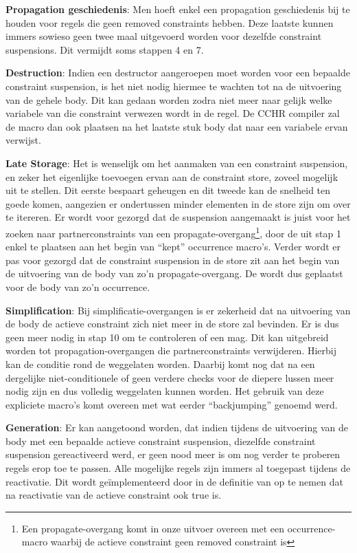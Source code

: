 {{\bf Propagation geschiedenis}: Men hoeft enkel een propagation geschiedenis bij te houden voor regels die geen removed constraints hebben. Deze laatste kunnen immers sowieso geen twee maal uitgevoerd worden voor dezelfde constraint suspensions. Dit vermijdt soms stappen 4 en 7.

{\bf Destruction}: Indien een destructor aangeroepen moet worden voor een bepaalde constraint suspension, is het niet nodig hiermee te wachten tot na de uitvoering van de gehele body. Dit kan gedaan worden zodra niet meer naar gelijk welke variabele van die constraint verwezen wordt in de regel. De CCHR compiler zal de  macro dan ook plaatsen na het laatste stuk body dat naar een variabele ervan verwijst.

{\bf Late Storage}: Het is wenselijk om het aanmaken van een constraint suspension, en zeker het eigenlijke toevoegen ervan aan de constraint store, zoveel mogelijk uit te stellen. Dit eerste bespaart geheugen en dit tweede kan de snelheid ten goede komen, aangezien er ondertussen minder elementen in de store zijn om over te itereren. Er wordt voor gezorgd dat de suspension aangemaakt is juist voor het zoeken naar partnerconstraints van een propagate-overgang\footnote{Een propagate-overgang komt in onze uitvoer overeen met een occurrence-macro waarbij de actieve constraint geen removed constraint is}, door de  uit stap 1 enkel te plaatsen aan het begin van ``kept'' occurrence macro's. Verder wordt er pas voor gezorgd dat de constraint suspension in de store zit aan het begin van de uitvoering van de body van zo'n propagate-overgang. De  wordt dus geplaatst voor de body van zo'n occurrence.

{\bf Simplification}: Bij simplificatie-overgangen is er zekerheid dat na uitvoering van de body de actieve constraint zich niet meer in de store zal bevinden. Er is dus geen  meer nodig in stap 10 om te controleren of een  mag. Dit kan uitgebreid worden tot propagation-overgangen die partnerconstraints verwijderen. Hierbij kan de  conditie rond de  weggelaten worden. Daarbij komt nog dat na een dergelijke niet-conditionele  of  geen verdere checks voor de diepere lussen meer nodig zijn en dus volledig weggelaten kunnen worden. Het gebruik van deze expliciete  macro's komt overeen met wat eerder ``backjumping'' genoemd werd.

{\bf Generation}: Er kan aangetoond worden, dat indien tijdens de uitvoering van de body met een bepaalde actieve constraint suspension, diezelfde constraint suspension gereactiveerd werd, er geen nood meer is om nog verder te proberen regels erop toe te passen. Alle mogelijke regels zijn immers al toegepast tijdens de reactivatie. Dit wordt ge\"implementeerd door in de definitie van  op te nemen dat  na reactivatie van de actieve constraint ook true is.

}
